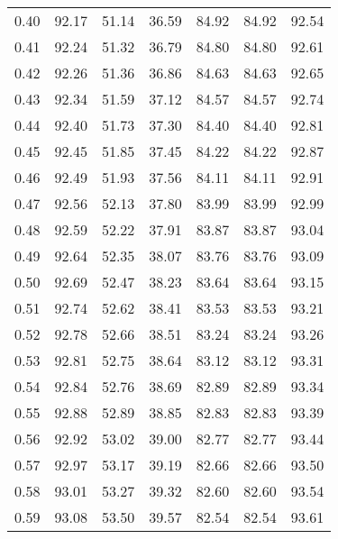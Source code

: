 \begin{tabular}{|c|c|c|c|c|c|c|}
      0.40 &     92.17 &     51.14 &      36.59 &   84.92 &      84.92 &         92.54 \\
      0.41 &     92.24 &     51.32 &      36.79 &   84.80 &      84.80 &         92.61 \\
      0.42 &     92.26 &     51.36 &      36.86 &   84.63 &      84.63 &         92.65 \\
      0.43 &     92.34 &     51.59 &      37.12 &   84.57 &      84.57 &         92.74 \\
      0.44 &     92.40 &     51.73 &      37.30 &   84.40 &      84.40 &         92.81 \\
      0.45 &     92.45 &     51.85 &      37.45 &   84.22 &      84.22 &         92.87 \\
      0.46 &     92.49 &     51.93 &      37.56 &   84.11 &      84.11 &         92.91 \\
      0.47 &     92.56 &     52.13 &      37.80 &   83.99 &      83.99 &         92.99 \\
      0.48 &     92.59 &     52.22 &      37.91 &   83.87 &      83.87 &         93.04 \\
      0.49 &     92.64 &     52.35 &      38.07 &   83.76 &      83.76 &         93.09 \\
      0.50 &     92.69 &     52.47 &      38.23 &   83.64 &      83.64 &         93.15 \\
      0.51 &     92.74 &     52.62 &      38.41 &   83.53 &      83.53 &         93.21 \\
      0.52 &     92.78 &     52.66 &      38.51 &   83.24 &      83.24 &         93.26 \\
      0.53 &     92.81 &     52.75 &      38.64 &   83.12 &      83.12 &         93.31 \\
      0.54 &     92.84 &     52.76 &      38.69 &   82.89 &      82.89 &         93.34 \\
      0.55 &     92.88 &     52.89 &      38.85 &   82.83 &      82.83 &         93.39 \\
      0.56 &     92.92 &     53.02 &      39.00 &   82.77 &      82.77 &         93.44 \\
      0.57 &     92.97 &     53.17 &      39.19 &   82.66 &      82.66 &         93.50 \\
      0.58 &     93.01 &     53.27 &      39.32 &   82.60 &      82.60 &         93.54 \\
      0.59 &     93.08 &     53.50 &      39.57 &   82.54 &      82.54 &         93.61 \\

\end{tabular}
